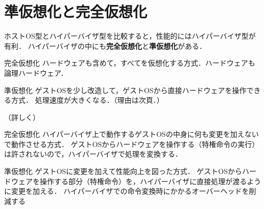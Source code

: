 \section{準仮想化と完全仮想化}\hypertarget{sec:準仮想化と完全仮想化}{}
\tocc
\begin{frame}[t]{\fftitle}
    ホストOS型とハイパーバイザ型を比較すると，性能的にはハイパーバイザ型が有利．
    ハイパーバイザの中にも\textbf{完全仮想化}と\textbf{準仮想化}がある．
    \begin{block}{完全仮想化}
        ハードウェアも含めて，すべてを仮想化する方式．ハードウェアも論理ハードウェア．
    \end{block}
    \begin{block}{準仮想化}
        ゲストOSを少し改造して，ゲストOSから直接ハードウェアを操作できる方式．
        処理速度が大きくなる．（理由は次頁．）
    \end{block}
    \hfill\hyperlink{sec:クラウドコンピューティング}{}
\end{frame}
\begin{frame}[t]{\fftitle （詳しく）}
    \begin{block}{完全仮想化}
        ハイパーバイザ上で動作するゲストOSの中身に何も変更を加えないで動作させる方式．
        ゲストOSからハードウェアを操作する（特権命令の実行）は許されないので，ハイパーバイザで処理を変換する．
    \end{block}
    \begin{block}{準仮想化}
        ゲストOSに変更を加えて性能向上を図った方式．
        ゲストOSからハードウェアを操作する部分（特権命令）を，ハイパーバイザに直接処理が渡るように変更を加える．
        ハイパーバイザでの命令変換時にかかるオーバーヘッドを削減する
    \end{block}
    \hfill\cite{仮想化技術}
\end{frame}
